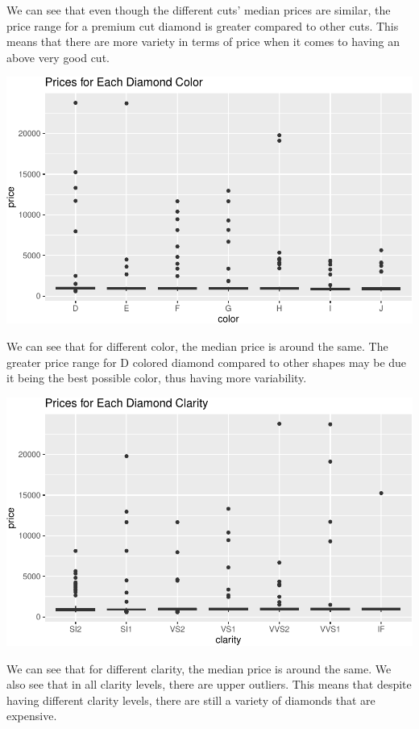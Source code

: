 \documentclass[
]{article}
\begin{document}
We can see that even though the different cuts' median prices are
similar, the price range for a premium cut diamond is greater compared
to other cuts. This means that there are more variety in terms of price
when it comes to having an above very good cut.

\begin{center}\includegraphics[width=0.8\linewidth]{Methods_and_Results_files/figure-latex/unnamed-chunk-10-1} \end{center}

We can see that for different color, the median price is around the
same. The greater price range for D colored diamond compared to other
shapes may be due it being the best possible color, thus having more
variability.

\begin{center}\includegraphics[width=0.8\linewidth]{Methods_and_Results_files/figure-latex/unnamed-chunk-11-1} \end{center}

We can see that for different clarity, the median price is around the
same. We also see that in all clarity levels, there are upper outliers.
This means that despite having different clarity levels, there are still
a variety of diamonds that are expensive.
\end{document}
